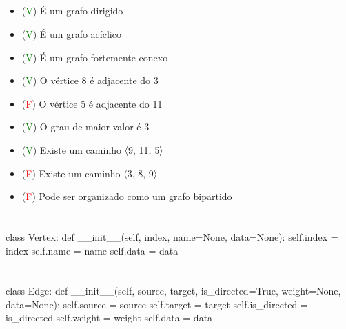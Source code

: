\documentclass{article}
\begin{document}
    \subsection{}
        \begin{itemize}
            \item[] (\textcolor{green}{V}) É um grafo dirigido
            \item[] (\textcolor{green}{V}) É um grafo acíclico
            \item[] (\textcolor{green}{V}) É um grafo fortemente conexo
            \item[] (\textcolor{green}{V}) O vértice 8 é adjacente do 3
            \item[] (\textcolor{red}{F}) O vértice 5 é adjacente do 11
            \item[] (\textcolor{green}{V}) O grau de maior valor é 3
            \item[] (\textcolor{green}{V}) Existe um caminho 〈9, 11, 5〉
            \item[] (\textcolor{red}{F}) Existe um caminho 〈3, 8, 9〉
            \item[] (\textcolor{red}{F}) Pode ser organizado como um grafo bipartido
        \end{itemize}
\section{} %
\begin{python}
class Vertex:
    def __init__(self, index, name=None, data=None):
        self.index = index
        self.name = name
        self.data = data
    
\end{python}
\section{} %
\begin{python}
class Edge:
    def __init__(self, source, target, is_directed=True, weight=None, data=None):
        self.source = source
        self.target = target
        self.is_directed = is_directed
        self.weight = weight
        self.data = data
\end{python}
\end{document}
